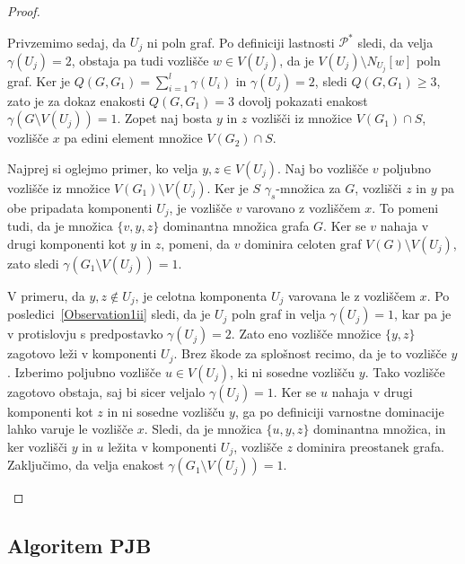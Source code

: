 \documentclass[12pt,a4paper,twoside]{article}
\theoremstyle{definition} %
\theoremstyle{plain} %
\numberwithin{equation}{section}  %
\begin{document}
\begin{proof}
\begin{itemize}
\begin{itemize}
\medskip
Privzemimo sedaj, da $U_j$ ni poln graf. Po definiciji lastnosti $\mathcal{P^*}$ sledi, da velja $\gamma(U_j) = 2$, obstaja pa tudi vozlišče $w \in V(U_j)$, da je $V(U_j) \setminus N_{U_j}[w]$ poln graf. Ker je $Q(G, G_1) = \sum\limits_{i=1}^l \gamma(U_i)$ in $\gamma(U_j) = 2$, sledi $Q(G, G_1) \geq 3$, zato je za dokaz enakosti $Q(G, G_1) = 3$ dovolj pokazati enakost $\gamma(G \setminus V(U_j)) = 1$. Zopet naj bosta $y$ in $z$ vozlišči iz množice $V(G_1) \cap S$, vozlišče $x$ pa edini element množice  $V(G_2) \cap S$. 

Najprej si oglejmo primer, ko velja $y, z \in V(U_j)$. Naj bo vozlišče $v$ poljubno vozlišče iz množice $V(G_1) \setminus V(U_j)$. Ker je $S$ $\gamma_s$-množica za $G$, vozlišči $z$ in $y$ pa obe pripadata komponenti $U_j$, je vozlišče $v$ varovano z vozliščem $x$. To pomeni tudi, da je množica $\{v, y, z\}$ dominantna množica grafa $G$. Ker se $v$ nahaja v drugi komponenti kot $y$ in $z$, pomeni, da $v$ dominira celoten graf $V(G) \setminus V(U_j)$, zato sledi $\gamma(G_1 \setminus V(U_j)) = 1$.

V primeru, da $y, z \not\in U_j$, je celotna komponenta $U_j$ varovana le z vozliščem $x$. Po posledici~\ref{Observation1ii} sledi, da je $U_j$ poln graf in velja $\gamma(U_j) = 1$, kar pa je v protislovju s predpostavko $\gamma(U_j) = 2$. Zato eno vozlišče množice $\{y, z\}$ zagotovo leži v komponenti $U_j$. Brez škode za splošnost recimo, da je to vozlišče $y$. Izberimo poljubno vozlišče $u \in V(U_j)$, ki ni sosedne vozlišču $y$. Tako vozlišče zagotovo obstaja, saj bi sicer veljalo $\gamma(U_j) = 1$. Ker se $u$ nahaja v drugi komponenti kot $z$ in ni sosedne vozlišču $y$, ga po definiciji varnostne dominacije lahko varuje le vozlišče $x$. Sledi, da je množica $\{u, y, z\}$ dominantna množica, in ker vozlišči $y$ in $u$ ležita v komponenti $U_j$, vozlišče $z$ dominira preostanek grafa. Zaključimo, da velja enakost $\gamma(G_1 \setminus V(U_j)) = 1$.
\end{itemize}
\end{itemize}
 \end{proof}
 
 \subsection{Algoritem PJB}
 
\end{document}
